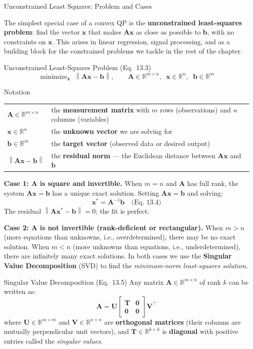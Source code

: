 \documentclass[aspectratio=169,10pt]{beamer}
\DeclareMathOperator*{\minimize}{minimize}
\newcommand{\bx}{\mathbf{x}}
\newcommand{\bb}{\mathbf{b}}
\newcommand{\bA}{\mathbf{A}}
\newcommand{\bU}{\mathbf{U}}
\newcommand{\bV}{\mathbf{V}}
\newcommand{\bT}{\mathbf{T}}
\newcommand{\R}{\mathbb{R}}
\newcommand{\norm}[1]{\left\|#1\right\|}
\begin{document}
\begin{frame}[allowframebreaks]{Unconstrained Least Squares: Problem and Cases}

  The simplest special case of a convex QP is the \textbf{unconstrained
  least-squares problem}: find the vector $\bx$ that makes $\bA\bx$ as close as
  possible to $\bb$, with no constraints on $\bx$.  This arises in linear
  regression, signal processing, and as a building block for the constrained
  problems we tackle in the rest of the chapter.

  \begin{block}{Unconstrained Least-Squares Problem (Eq.~13.3)}
    \[
      \minimize_{\bx}\; \norm{\bA\bx - \bb},
      \qquad \bA \in \R^{m\times n},\;\; \bx \in \R^n,\;\; \bb \in \R^m
    \]
  \end{block}

  \begin{block}{Notation}
    \begin{tabular}{ll}
      $\bA \in \R^{m\times n}$ & the \textbf{measurement matrix} with $m$ rows (observations) and $n$ columns (variables)\\
      $\bx \in \R^n$ & the \textbf{unknown vector} we are solving for\\
      $\bb \in \R^m$ & the \textbf{target vector} (observed data or desired output)\\
      $\norm{\bA\bx - \bb}$ & the \textbf{residual norm} --- the Euclidean distance between $\bA\bx$ and $\bb$\\
    \end{tabular}
  \end{block}

  \framebreak

  \textbf{Case 1: $\bA$ is square and invertible.}  When $m = n$ and $\bA$ has
  full rank, the system $\bA\bx = \bb$ has a unique exact solution.  Setting
  $\bA\bx = \bb$ and solving:
  \[
    \bx^* = \bA^{-1}\bb \quad\text{(Eq.~13.4)}
  \]
  The residual $\norm{\bA\bx^* - \bb} = 0$; the fit is perfect.

  \textbf{Case 2: $\bA$ is not invertible (rank-deficient or rectangular).}
  When $m > n$ (more equations than unknowns, i.e., overdetermined), there may be
  no exact solution.  When $m < n$ (more unknowns than equations, i.e.,
  underdetermined), there are infinitely many exact solutions.  In both cases we
  use the \textbf{Singular Value Decomposition} (SVD) to find the
  \emph{minimum-norm least-squares solution}.

  \begin{block}{Singular Value Decomposition (Eq.~13.5)}
    Any matrix $\bA \in \R^{m\times n}$ of rank $k$ can be written as:
    \[
      \bA = \bU\begin{bmatrix}\bT & \mathbf{0}\\\mathbf{0}&\mathbf{0}\end{bmatrix}\bV^{\top}
    \]
    where $\bU \in \R^{m\times m}$ and $\bV \in \R^{n\times n}$ are
    \textbf{orthogonal matrices} (their columns are mutually perpendicular unit
    vectors), and $\bT \in \R^{k\times k}$ is \textbf{diagonal} with positive entries
    called the \emph{singular values}.
  \end{block}


\end{frame}
\end{document}
